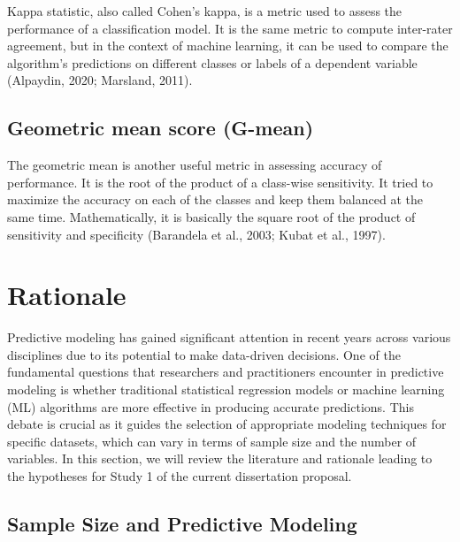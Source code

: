 \documentclass[
  man]{apa7}
\begin{document}
Kappa statistic, also called Cohen's kappa, is a metric used to assess the performance of a classification model.
It is the same metric to compute inter-rater agreement, but in the context of machine learning, it can be used to compare the algorithm's predictions on different classes or labels of a dependent variable (Alpaydin, 2020; Marsland, 2011).

\hypertarget{geometric-mean-score-g-mean}{%
\subsection{Geometric mean score (G-mean)}\label{geometric-mean-score-g-mean}}

The geometric mean is another useful metric in assessing accuracy of performance.
It is the root of the product of a class-wise sensitivity.
It tried to maximize the accuracy on each of the classes and keep them balanced at the same time.
Mathematically, it is basically the square root of the product of sensitivity and specificity (Barandela et al., 2003; Kubat et al., 1997).

\hypertarget{rationale}{%
\section{Rationale}\label{rationale}}

Predictive modeling has gained significant attention in recent years across various disciplines due to its potential to make data-driven decisions.
One of the fundamental questions that researchers and practitioners encounter in predictive modeling is whether traditional statistical regression models or machine learning (ML) algorithms are more effective in producing accurate predictions.
This debate is crucial as it guides the selection of appropriate modeling techniques for specific datasets, which can vary in terms of sample size and the number of variables.
In this section, we will review the literature and rationale leading to the hypotheses for Study 1 of the current dissertation proposal.

\hypertarget{sample-size-and-predictive-modeling}{%
\subsection{Sample Size and Predictive Modeling}\label{sample-size-and-predictive-modeling}}
\end{document}
